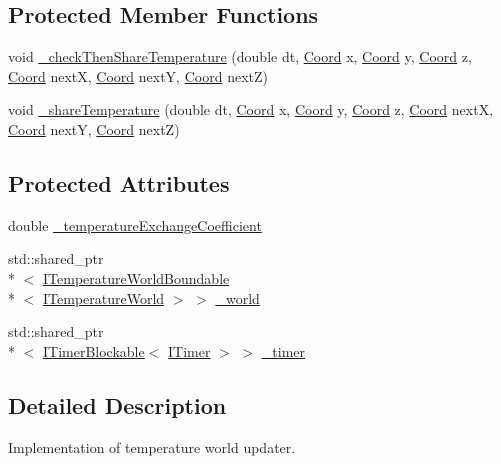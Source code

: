 \subsection*{Protected Member Functions}
\begin{DoxyCompactItemize}
\item 
void \hyperlink{class_average_share_temperature_world_updater_a70a05789b5cfa32fc7bcdf8ceb94e66f}{\-\_\-check\-Then\-Share\-Temperature} (double dt, \hyperlink{struct_coord}{Coord} x, \hyperlink{struct_coord}{Coord} y, \hyperlink{struct_coord}{Coord} z, \hyperlink{struct_coord}{Coord} next\-X, \hyperlink{struct_coord}{Coord} next\-Y, \hyperlink{struct_coord}{Coord} next\-Z)
\item 
void \hyperlink{class_average_share_temperature_world_updater_aaf03625100ff7cd459c32bbd33956e33}{\-\_\-share\-Temperature} (double dt, \hyperlink{struct_coord}{Coord} x, \hyperlink{struct_coord}{Coord} y, \hyperlink{struct_coord}{Coord} z, \hyperlink{struct_coord}{Coord} next\-X, \hyperlink{struct_coord}{Coord} next\-Y, \hyperlink{struct_coord}{Coord} next\-Z)
\end{DoxyCompactItemize}
\subsection*{Protected Attributes}
\begin{DoxyCompactItemize}
\item 
double \hyperlink{class_average_share_temperature_world_updater_a37ebe90d538e148a8da4efa0845d334c}{\-\_\-temperature\-Exchange\-Coefficient}
\item 
std\-::shared\-\_\-ptr\\*
$<$ \hyperlink{class_i_temperature_world_boundable}{I\-Temperature\-World\-Boundable}\\*
$<$ \hyperlink{class_i_temperature_world}{I\-Temperature\-World} $>$ $>$ \hyperlink{class_average_share_temperature_world_updater_a7327a9c0043f7fd278edcc1e7b7ecf78}{\-\_\-world}
\item 
std\-::shared\-\_\-ptr\\*
$<$ \hyperlink{class_i_timer_blockable}{I\-Timer\-Blockable}$<$ \hyperlink{class_i_timer}{I\-Timer} $>$ $>$ \hyperlink{class_average_share_temperature_world_updater_acc17234a8b1f33e1be9c7806e4973be3}{\-\_\-timer}
\end{DoxyCompactItemize}


\subsection{Detailed Description}
Implementation of temperature world updater.

